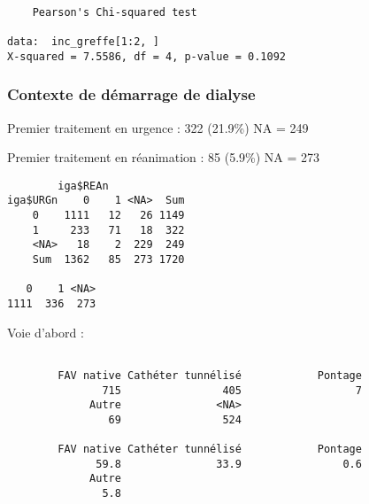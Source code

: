 \documentclass[11pt,a4paper]{article}\usepackage[]{graphicx}\usepackage[]{color}
\makeatletter
\newenvironment{kframe}{%
 \def\at@end@of@kframe{}%
 \ifinner\ifhmode%
  \def\at@end@of@kframe{\end{minipage}}%
  \begin{minipage}{\columnwidth}%
 \fi\fi%
 \def\FrameCommand##1{\hskip\@totalleftmargin \hskip-\fboxsep
 \colorbox{shadecolor}{##1}\hskip-\fboxsep
     \hskip-\linewidth \hskip-\@totalleftmargin \hskip\columnwidth}%
 \MakeFramed {\advance\hsize-\width
   \@totalleftmargin\z@ \linewidth\hsize
   \@setminipage}}%
 {\par\unskip\endMakeFramed%
 \at@end@of@kframe}
\newenvironment{knitrout}{}{} %
\makeatother
\begin{document}
\begin{knitrout}
\color{fgcolor}\begin{kframe}
\begin{verbatim}

	Pearson's Chi-squared test

data:  inc_greffe[1:2, ]
X-squared = 7.5586, df = 4, p-value = 0.1092
\end{verbatim}
\end{kframe}
\end{knitrout}


    \subsubsection{Contexte de démarrage de dialyse}
    
Premier traitement en urgence :  322 (21.9\%) NA = 249

Premier traitement en réanimation :  85 (5.9\%) NA = 273

\begin{knitrout}
\color{fgcolor}\begin{kframe}
\begin{verbatim}
        iga$REAn
iga$URGn    0    1 <NA>  Sum
    0    1111   12   26 1149
    1     233   71   18  322
    <NA>   18    2  229  249
    Sum  1362   85  273 1720

   0    1 <NA> 
1111  336  273 
\end{verbatim}
\end{kframe}
\end{knitrout}

Voie d’abord :
\begin{knitrout}
\color{fgcolor}\begin{kframe}
\begin{verbatim}

        FAV native Cathéter tunnélisé            Pontage 
               715                405                  7 
             Autre               <NA> 
                69                524 

        FAV native Cathéter tunnélisé            Pontage 
              59.8               33.9                0.6 
             Autre 
               5.8 
\end{verbatim}
\end{kframe}
\end{knitrout}
\end{document}
